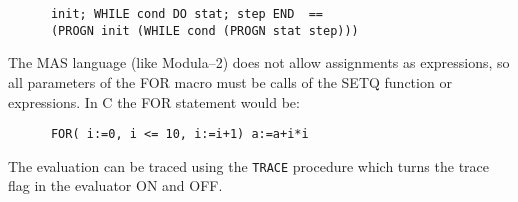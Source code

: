 \begin{verbatim}
      init; WHILE cond DO stat; step END  ==
      (PROGN init (WHILE cond (PROGN stat step)))
\end{verbatim}

The MAS language (like Modula--2) does not allow 
assignments as expressions, so all parameters 
of the FOR macro must be calls of the SETQ 
function or expressions.
In C the FOR statement would be:

\begin{verbatim}
      FOR( i:=0, i <= 10, i:=i+1) a:=a+i*i
\end{verbatim}

The evaluation can be traced using the \verb/TRACE/ procedure
which turns the trace flag in the evaluator ON and OFF.

